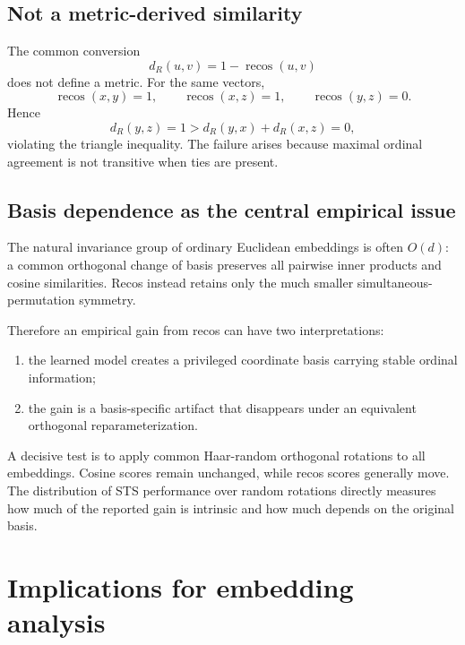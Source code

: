 \documentclass[11pt,a4paper]{article}
\newcommand{\recos}{\operatorname{recos}}
\begin{document}
\subsection{Not a metric-derived similarity}

The common conversion
\begin{equation}
    d_R(u,v)=1-\recos(u,v)
\end{equation}
does not define a metric. For the same vectors,
\begin{equation}
    \recos(x,y)=1,
    \qquad
    \recos(x,z)=1,
    \qquad
    \recos(y,z)=0.
\end{equation}
Hence
\begin{equation}
    d_R(y,z)=1
    >d_R(y,x)+d_R(x,z)=0,
\end{equation}
violating the triangle inequality. The failure arises because maximal ordinal agreement is not transitive when ties are present.

\subsection{Basis dependence as the central empirical issue}

The natural invariance group of ordinary Euclidean embeddings is often $O(d)$: a common orthogonal change of basis preserves all pairwise inner products and cosine similarities. Recos instead retains only the much smaller simultaneous-permutation symmetry.

Therefore an empirical gain from recos can have two interpretations:
\begin{enumerate}[leftmargin=2em]
    \item the learned model creates a privileged coordinate basis carrying stable ordinal information;
    \item the gain is a basis-specific artifact that disappears under an equivalent orthogonal reparameterization.
\end{enumerate}
A decisive test is to apply common Haar-random orthogonal rotations to all embeddings. Cosine scores remain unchanged, while recos scores generally move. The distribution of STS performance over random rotations directly measures how much of the reported gain is intrinsic and how much depends on the original basis.

\section{Implications for embedding analysis}
\end{document}
